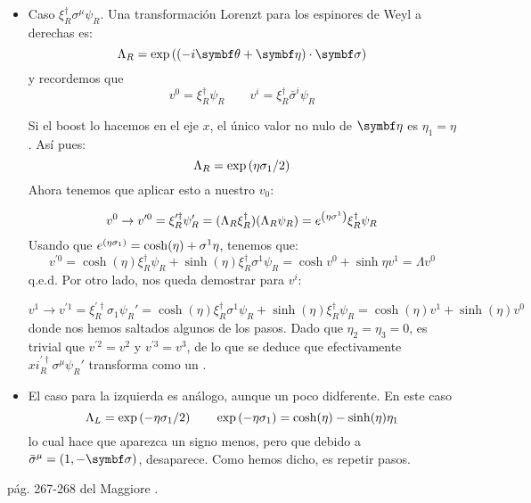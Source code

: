 \begin{itemize}
    \item Caso $\xi_R^\dagger \sigma^\mu \psi_R$. Una transformación Lorenzt para los espinores de Weyl a derechas es:   
    \begin{equation}
        \Lambda_R = \exp \pqty{(-i\thetan  + \etan)\cdot \sigman}
    \end{equation}
    y recordemos que 
    \begin{equation}
        v^0=\xi_R^\dagger \psi_R \qquad v^i =\xi_R^\dagger  \bar{\sigma}^i \psi_R
    \end{equation}

    Si el boost lo hacemos en el eje $x$, el único valor no nulo de $\etan$ es $\eta_1=\eta$. Así pues:  
    \begin{equation}
        \Lambda_R = \exp \pqty{\eta  \sigma_1/2}
    \end{equation}
    Ahora tenemos que aplicar esto a nuestro $v_0$: 

    \begin{equation}
        v^0 \to v^{\prime 0}= \xi_R^{\prime \dagger} \psi_R' = (\Lambda_R \xi_R^\dagger) (\Lambda_R \psi_R) = e^{\pqty{ \eta  \sigma^1}}\xi_R^\dagger \psi_R 
    \end{equation}
    Usando que $e^{\pqty{ \eta  \sigma_1}} = \cosh (\eta)+\sigma^1 \eta $, tenemos que: 
    \begin{equation}
        v^{\prime 0}= \cosh (\eta) \xi_R^\dagger \psi_R  + \sinh (\eta) \xi_R^\dagger  \sigma^1 \psi_R = \cosh v^0 + \sinh \eta v^1 =  \Lambda v^0 
    \end{equation}  
    q.e.d. Por otro lado, nos queda demostrar para $v^i$:
    
    \begin{equation}
        v^1 \to v^{\prime 1}= \xi_R^{\prime \dagger} \sigma_1 \psi_R' = \cosh (\eta) \xi_R^\dagger \sigma^1 \psi_R  + \sinh (\eta) \xi_R^\dagger \psi_R = \cosh (\eta) v^1 + \sinh (\eta) v^0
    \end{equation}  
    donde nos hemos saltados algunos de los pasos. Dado que $\eta_2=\eta_3=0$, es trivial que $v^{\prime 2} = v^2$ y $v^{\prime 3} = v^3$, de lo que se deduce que efectivamente $xi_R^{\prime \dagger} \sigma^\mu \psi_R'$ transforma como un .
    \item El caso para la izquierda es análogo, aunque un poco didferente. En este caso 
    \begin{equation}
        \Lambda_L = \exp \pqty{-\eta  \sigma_1/2} \qquad \exp \pqty{-\eta  \sigma_1} = \cosh (\eta) - \sinh (\eta) \eta_1
    \end{equation}
    lo cual hace que aparezca un signo menos, pero que debido a $\bar{\sigma}^\mu = (1,-\sigman)$, desaparece. Como hemos dicho, es repetir pasos.   
\end{itemize}
pág. 267-268 del Maggiore \cite{Maggiore:2005qv}.

